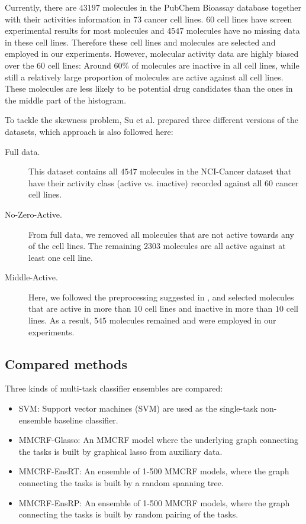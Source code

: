 \documentclass[runningheads,a4paper]{llncs}
\begin{document}
Currently, there are $43197$ molecules in the PubChem Bioassay database together with their activities information in $73$ cancer cell lines. $60$ cell lines have screen experimental results for most molecules and $4547$ molecules have no missing data in these cell lines. Therefore these cell lines and molecules are selected and employed in our experiments. However, molecular activity data are highly biased over the $60$ cell lines: Around $60\%$ of molecules are inactive in all cell lines, while still a relatively large proportion of molecules are active against all cell lines. These molecules are less likely to be potential drug candidates than the ones in the middle part of the histogram. 

To tackle the skewness  problem, Su et al. \cite{su2010} prepared three different versions of the datasets, which approach is also followed here:
\begin{description}
  \item[Full data.] This dataset contains all $4547$ molecules in the NCI-Cancer dataset that have their activity class (active vs. inactive) recorded against all $60$ cancer cell lines.
  \item[No-Zero-Active.] From full data, we removed all molecules that are not active towards any of the cell lines. The remaining $2303$ molecules are all active against at least one cell line.
  \item[Middle-Active.] Here, we followed the preprocessing suggested in \cite{shivakumar09}, and selected molecules that are active in more than \(10\) cell lines and inactive in more than \(10\) cell lines. As a result, \(545\) molecules remained and were employed in our experiments.
\end{description}

\subsection{Compared methods}

Three kinds of multi-task classifier ensembles are compared: 
\begin{itemize}
  \item SVM: Support vector machines (SVM) are used as the single-task non-ensemble baseline classifier. 
   \item MMCRF-Glasso: An MMCRF model where the underlying graph connecting the tasks is built by graphical lasso from auxiliary data.
  \item MMCRF-EnsRT: An ensemble of 1-500 MMCRF models, where the graph connecting the tasks is built by a random spanning tree.
  \item MMCRF-EnsRP: An ensemble  of 1-500 MMCRF models, where the graph connecting the tasks is built by random pairing of the tasks.
\end{itemize} 
\end{document}
